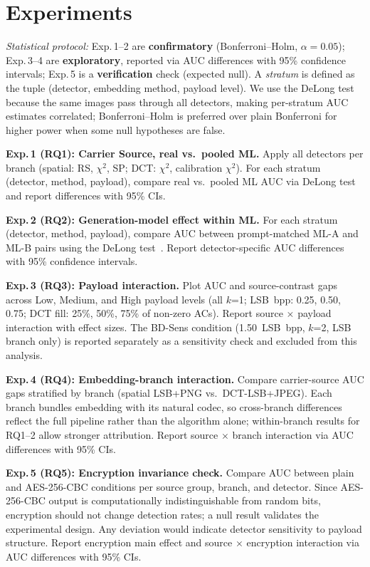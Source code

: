 \documentclass[10pt,twocolumn,a4paper]{article}
\begin{document}
\section{Experiments}
\label{sec:experiments}

\noindent\textit{Statistical protocol:} Exp.\,1--2 are \textbf{confirmatory} (Bonferroni--Holm, $\alpha = 0.05$); Exp.\,3--4 are \textbf{exploratory}, reported via AUC differences with 95\% confidence intervals; Exp.\,5 is a \textbf{verification} check (expected null). A \emph{stratum} is defined as the tuple (detector, embedding method, payload level). We use the DeLong test~\cite{delong1988} because the same images pass through all detectors, making per-stratum AUC estimates correlated; Bonferroni--Holm is preferred over plain Bonferroni for higher power when some null hypotheses are false.

\textbf{Exp.\,1 (RQ1): Carrier Source, real vs.\ pooled ML.} Apply all detectors per branch (spatial: RS, $\chi^2$, SP; DCT: $\chi^2$, calibration $\chi^2$). For each stratum (detector, method, payload), compare real vs.\ pooled ML AUC via DeLong test and report differences with 95\% CIs.

\textbf{Exp.\,2 (RQ2): Generation-model effect within ML.} For each stratum (detector, method, payload), compare AUC between prompt-matched ML-A and ML-B pairs using the DeLong test~\cite{delong1988}. Report detector-specific AUC differences with 95\% confidence intervals.

\textbf{Exp.\,3 (RQ3): Payload interaction.} Plot AUC and source-contrast gaps across Low, Medium, and High payload levels (all $k$=1; LSB~bpp: 0.25, 0.50, 0.75; DCT fill: 25\%, 50\%, 75\% of non-zero ACs). Report source $\times$ payload interaction with effect sizes. The BD-Sens condition (1.50~LSB~bpp, $k$=2, LSB branch only) is reported separately as a sensitivity check and excluded from this analysis.

\textbf{Exp.\,4 (RQ4): Embedding-branch interaction.} Compare carrier-source AUC gaps stratified by branch (spatial LSB+PNG vs.\ DCT-LSB+JPEG). Each branch bundles embedding with its natural codec, so cross-branch differences reflect the full pipeline rather than the algorithm alone; within-branch results for RQ1--2 allow stronger attribution. Report source $\times$ branch interaction via AUC differences with 95\% CIs.

\textbf{Exp.\,5 (RQ5): Encryption invariance check.} Compare AUC between plain and AES-256-CBC conditions per source group, branch, and detector. Since AES-256-CBC output is computationally indistinguishable from random bits, encryption should not change detection rates; a null result validates the experimental design. Any deviation would indicate detector sensitivity to payload structure. Report encryption main effect and source $\times$ encryption interaction via AUC differences with 95\% CIs.
\end{document}
